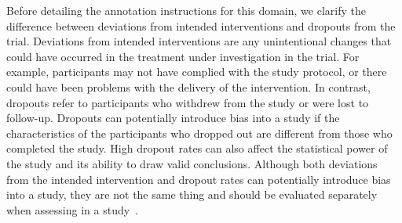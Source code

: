 \documentclass[sn-mathphys,Numbered]{sn-jnl}%
\begin{document}
Before detailing the annotation instructions for this domain, we clarify the difference between deviations from intended interventions and dropouts from the trial.
Deviations from intended interventions are any unintentional changes that could have occurred in the treatment under investigation in the trial.
For example, participants may not have complied with the study protocol, or there could have been problems with the delivery of the intervention.
In contrast, dropouts refer to participants who withdrew from the study or were lost to follow-up.
Dropouts can potentially introduce bias into a study if the characteristics of the participants who dropped out are different from those who completed the study.
High dropout rates can also affect the statistical power of the study and its ability to draw valid conclusions.
Although both deviations from the intended intervention and dropout rates can potentially introduce bias into a study, they are not the same thing and should be evaluated separately when assessing in a study~\cite{imel2013meta,cedenilla2023psychosocial}.
%
%
%
\end{document}
